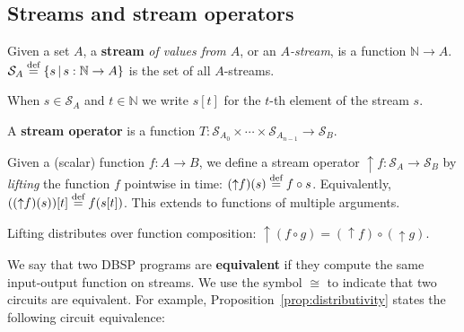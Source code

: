 \documentclass[twocolumn
]{svjour3}
\newif\ifstreamexamples
\numberwithin{equation}{section}
\newcommand{\dbsp}{DBSP\xspace}
\newcommand{\defined}[1]{\textbf{#1}\index{}}
\newcommand{\N}{\mathbb{N}}  %
\newcommand{\stream}[1]{\ensuremath{\mathcal{S}_{#1}}}
\newcommand{\defn}{\stackrel{\textrm{\scriptsize def}}{=}}
\newcommand{\lift}[1]{{\uparrow}#1}
\newcommand{\sv}[1]{ %
\setsepchar{ }
\readlist\arg{#1}
\setlength\tabcolsep{4pt}
\begin{tabular}{|c|c|c|c|c|} \hline
  \!\ensuremath{\cdots}\! &
  \!\ensuremath{\arg[4]}\! &
  \!\ensuremath{\arg[3]}\! &
  \!\ensuremath{\arg[2]}\! &
  \!\ensuremath{\arg[1]}\!
  \\ \hline
\end{tabular}
}
\begin{document}
\subsection{Streams and stream operators}\label{sec:notation}

\begin{definition}[stream]
Given a set $A$, a \defined{stream} \emph{of values from $A$}, or an
\emph{$A$-stream}, is a function $\N \rightarrow A$.  $\stream{A}
\defn \{ s \,|\, s : \N \to A \}$ is the set of all $A$-streams.
\end{definition}

When $s\in\stream{A}$ and $t\in\N$ we
write $s[t]$ for the $t$-th element of the stream $s$.

\begin{definition}
A \defined{stream operator} is a function
$T:\stream{A_0}\times\cdots\times\stream{A_{n-1}}\to\stream{B}$.
\end{definition}

\begin{definition}[lifting]
Given a (scalar) function $f: A \to B$,
we define a stream operator $\lift{f} :\stream{A} \to \stream{B}$
by \emph{lifting} the function $f$ pointwise in time: $(\lift{f})(s) \defn f \circ s$.
Equivalently, $((\lift{f})(s))[t] \defn f(s[t])$.
This extends to functions of multiple arguments.
\end{definition}

\ifstreamexamples
For example, $(\lift{(\lambda x.(2x))})(id) = \sv{0 2 4 6 8}$.
\fi

\begin{proposition}[distributivity]\label{prop:distributivity}
Lifting distributes over function composition:
$\lift{(f \circ g)} = (\lift{f}) \circ (\lift{g})$.
\end{proposition}

We say that two \dbsp programs are \defined{equivalent} if they compute the same
input-output function on streams.
We use the symbol $\cong$ to indicate that two circuits are
equivalent.  For example, Proposition~\ref{prop:distributivity}
states the following circuit equivalence:
\end{document}
